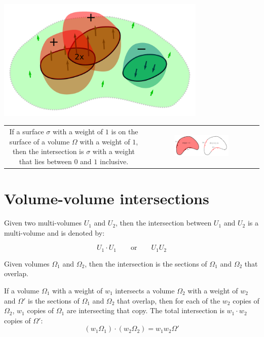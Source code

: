 \begin{center}
\includegraphics[width = 0.75\textwidth]{Intersections/Surface-volume_intersections/surface_volume_intersections_example_3}
\end{center}

\begin{tabular}{cc}
\parbox{0.5\textwidth}{
If a surface \(\sigma\) with a weight of \(1\) is on the surface of a volume \(\Omega\) with a weight of \(1\), then the intersection is \(\sigma\) with a weight that lies between \(0\) and \(1\) inclusive.
} & \parbox{0.5\textwidth}{
\includegraphics[width = 0.5\textwidth]{Intersections/Surface-volume_intersections/surface_volume_intersection_boundary_case}
}
\end{tabular}





\section{Volume-volume intersections}

Given two multi-volumes \(U_1\) and \(U_2\), then the intersection between \(U_1\) and \(U_2\) is a multi-volume and is denoted by:

\[U_1 \cdot U_1 \quad\quad\text{or}\quad\quad U_1 U_2\]

Given volumes \(\Omega_1\) and \(\Omega_2\), then the intersection is the sections of \(\Omega_1\) and \(\Omega_2\) that overlap. 

If a volume \(\Omega_1\) with a weight of \(w_1\) intersects a volume \(\Omega_2\) with a weight of \(w_2\) and \(\Omega'\) is the sections of \(\Omega_1\) and \(\Omega_2\) that overlap, then for each of the \(w_2\) copies of \(\Omega_2\), \(w_1\) copies of \(\Omega_1\) are intersecting that copy. The total intersection is \(w_1 \cdot w_2\) copies of \(\Omega'\):
\[(w_1\Omega_1) \cdot (w_2\Omega_2) = w_1 w_2 \Omega'\] 

